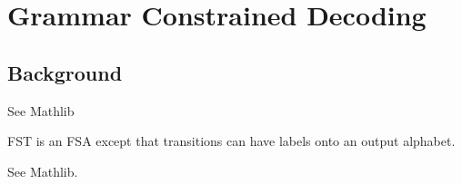 \section{Grammar Constrained Decoding}

\subsection{Background}
\begin{definition}
    \label{def:FSA}
    See Mathlib
\end{definition}

\begin{definition}
    \label{def:FST}
    FST is an FSA except that transitions can have labels onto an output alphabet.
\end{definition}

\begin{definition}
    \label{def:CFG}
    See Mathlib. 
\end{definition}

